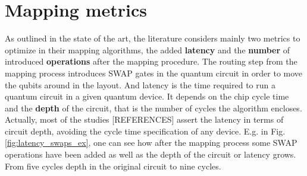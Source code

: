 \section*{Mapping metrics}
\label{sec:org6169cec}

As outlined in the state of the art, the literature considers mainly two metrics to optimize in their mapping algorithms, the added \textbf{latency} and the \textbf{number} of introduced \textbf{operations} after the mapping procedure.
The routing step from the mapping process introduces SWAP gates in the quantum circuit in order to move the qubits around in the layout.
And latency is the time required to run a quantum circuit in a given quantum device.
It depends on the chip cycle time and the \textbf{depth} of the circuit, that is the number of cycles the algorithm encloses.
Actually, most of the studies [REFERENCES] assert the latency in terms of circuit depth, avoiding the cycle time specification of any device.
E.g. in Fig. \ref{fig:latency_swaps_ex}, one can see how after the mapping process some SWAP operations have been added as well as the depth of the circuit or latency grows.
From five cycles depth in the original circuit to nine cycles.


